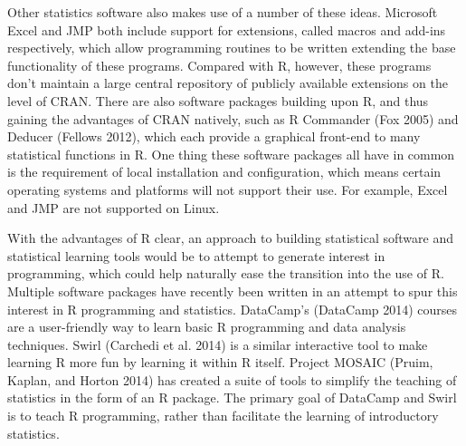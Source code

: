 \documentclass[12pt,]{article}
\begin{document}
Other statistics software also makes use of a number of these ideas.
Microsoft Excel and JMP both include support for extensions, called
macros and add-ins respectively, which allow programming routines to be
written extending the base functionality of these programs. Compared
with R, however, these programs don't maintain a large central
repository of publicly available extensions on the level of CRAN. There
are also software packages building upon R, and thus gaining the
advantages of CRAN natively, such as R Commander (Fox 2005) and Deducer
(Fellows 2012), which each provide a graphical front-end to many
statistical functions in R. One thing these software packages all have
in common is the requirement of local installation and configuration,
which means certain operating systems and platforms will not support
their use. For example, Excel and JMP are not supported on Linux.

With the advantages of R clear, an approach to building statistical
software and statistical learning tools would be to attempt to generate
interest in programming, which could help naturally ease the transition
into the use of R. Multiple software packages have recently been written
in an attempt to spur this interest in R programming and statistics.
DataCamp's (DataCamp 2014) courses are a user-friendly way to learn
basic R programming and data analysis techniques. Swirl (Carchedi et al.
2014) is a similar interactive tool to make learning R more fun by
learning it within R itself. Project MOSAIC (Pruim, Kaplan, and Horton
2014) has created a suite of tools to simplify the teaching of
statistics in the form of an R package. The primary goal of DataCamp and
Swirl is to teach R programming, rather than facilitate the learning of
introductory statistics.
\end{document}
